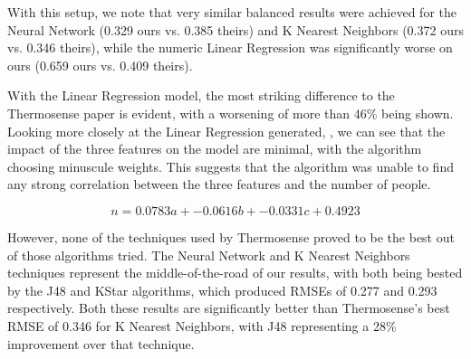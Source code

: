 \documentclass[../thesis/thesis.tex]{subfiles}
\begin{document}
With this setup, we note that very similar balanced results were achieved for the Neural Network (0.329 ours vs. 0.385 theirs) and K Nearest Neighbors (0.372 ours vs. 0.346 theirs), while the numeric Linear Regression was significantly worse on ours (0.659 ours vs. 0.409 theirs).

With the Linear Regression model, the most striking difference to the Thermosense paper is evident, with a worsening of more than 46\% being shown. Looking more closely at the Linear Regression generated, , we can see that the impact of the three features on the model are minimal, with the algorithm choosing minuscule weights. This suggests that the algorithm was unable to find any strong correlation between the three features and the number of people.

\begin{equation} \label{eq:linreg}
n = 0.0783a + -0.0616b + -0.0331c + 0.4923
\end{equation}

However, none of the techniques used by Thermosense proved to be the best out of those algorithms tried. The Neural Network and K Nearest Neighbors techniques represent the middle-of-the-road of our results, with both being bested by the J48 and KStar algorithms, which produced RMSEs of 0.277 and 0.293 respectively. Both these results are significantly better than Thermosense's best RMSE of 0.346 for K Nearest Neighbors, with J48 representing a 28\% improvement over that technique.



\end{document}
